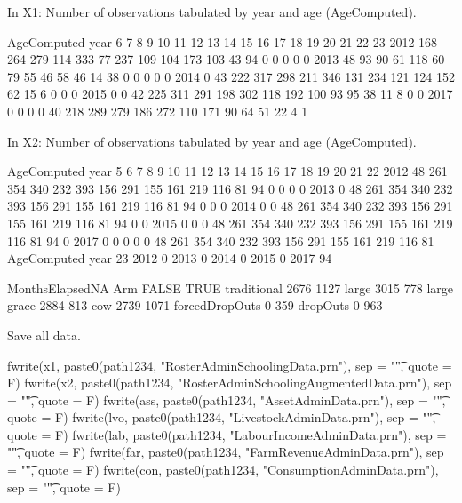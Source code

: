 In \textsf{X1}: Number of observations tabulated by year and age (\textsf{AgeComputed}).
\begin{Schunk}
\begin{Soutput}
      AgeComputed
year     6   7   8   9  10  11  12  13  14  15  16  17  18  19  20  21  22  23
  2012 168 264 279 114 333  77 237 109 104 173 103  43  94   0   0   0   0   0
  2013  48  93  90  61 118  60  79  55  46  58  46  14  38   0   0   0   0   0
  2014   0  43 222 317 298 211 346 131 234 121 124 152  62  15   6   0   0   0
  2015   0   0  42 225 311 291 198 302 118 192 100  93  95  38  11   8   0   0
  2017   0   0   0   0  40 218 289 279 186 272 110 171  90  64  51  22   4   1
\end{Soutput}
\end{Schunk}
In \textsf{X2}: Number of observations tabulated by year and age (\textsf{AgeComputed}).
\begin{Schunk}
\begin{Soutput}
      AgeComputed
year     5   6   7   8   9  10  11  12  13  14  15  16  17  18  19  20  21  22
  2012  48 261 354 340 232 393 156 291 155 161 219 116  81  94   0   0   0   0
  2013   0  48 261 354 340 232 393 156 291 155 161 219 116  81  94   0   0   0
  2014   0   0  48 261 354 340 232 393 156 291 155 161 219 116  81  94   0   0
  2015   0   0   0  48 261 354 340 232 393 156 291 155 161 219 116  81  94   0
  2017   0   0   0   0   0  48 261 354 340 232 393 156 291 155 161 219 116  81
      AgeComputed
year    23
  2012   0
  2013   0
  2014   0
  2015   0
  2017  94
\end{Soutput}
\end{Schunk}
\begin{Schunk}
\begin{Soutput}
                MonthsElapsedNA
Arm              FALSE TRUE
  traditional     2676 1127
  large           3015  778
  large grace     2884  813
  cow             2739 1071
  forcedDropOuts     0  359
  dropOuts           0  963
\end{Soutput}
\end{Schunk}

Save all data.

\begin{Schunk}
\begin{Sinput}
fwrite(x1, paste0(path1234, "RosterAdminSchoolingData.prn"), sep = "\t", quote = F)
fwrite(x2, paste0(path1234, "RosterAdminSchoolingAugmentedData.prn"), sep = "\t", quote = F)
fwrite(ass, paste0(path1234, "AssetAdminData.prn"), sep = "\t", quote = F)
fwrite(lvo, paste0(path1234, "LivestockAdminData.prn"), sep = "\t", quote = F)
fwrite(lab, paste0(path1234, "LabourIncomeAdminData.prn"), sep = "\t", quote = F)
fwrite(far, paste0(path1234, "FarmRevenueAdminData.prn"), sep = "\t", quote = F)
fwrite(con, paste0(path1234, "ConsumptionAdminData.prn"), sep = "\t", quote = F)
\end{Sinput}
\end{Schunk}

